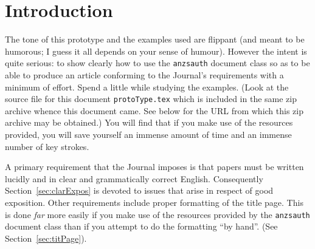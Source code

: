 \documentclass[times, doublespace]{anzsauth}
\begin{document}


\maketitle
\section{Introduction}
\label{sec:intro}
The tone of this prototype and the examples used are flippant
(and meant to be humorous; I guess it all depends on your sense
of humour).  However the intent is quite serious:  to show clearly
how to use the \texttt{anzsauth} document class so as to be able to
produce an article conforming to the Journal's requirements with
a minimum of effort.  Spend a little while studying the examples.
(Look at the source file for this document \texttt{protoType.tex}
which is included in the same zip archive whence this document came.
See below for the URL from which this zip archive may be obtained.)
You will find that if you make use of the resources provided, you
will save yourself an immense amount of time and an immense number
of key strokes.

A primary requirement that the Journal imposes is that papers must
be written lucidly and in clear and grammatically correct English.
Consequently Section~\ref{sec:clarExpos} is devoted to issues that
arise in respect of good exposition.  Other requirements include
proper formatting of the title page.  This is done \emph{far}
more easily if you make use of the resources provided by the
\texttt{anzsauth} document class than if you attempt to do the
formatting ``by hand''.  (See Section~\ref{sec:titPage}).
\end{document}
